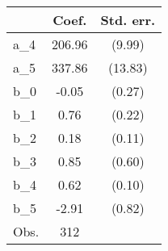 {
\def\sym#1{\ifmmode^{#1}\else\(^{#1}\)\fi}
\begin{tabular}{l*{1}{cc}}
\hline\hline
                &    Coef.&Std. err.\\
\hline
a\_4             &   206.96&   (9.99)\\
a\_5             &   337.86&  (13.83)\\
b\_0             &    -0.05&   (0.27)\\
b\_1             &     0.76&   (0.22)\\
b\_2             &     0.18&   (0.11)\\
b\_3             &     0.85&   (0.60)\\
b\_4             &     0.62&   (0.10)\\
b\_5             &    -2.91&   (0.82)\\
\hline
Obs.            &      312&         \\
\hline\hline
\end{tabular}
}
